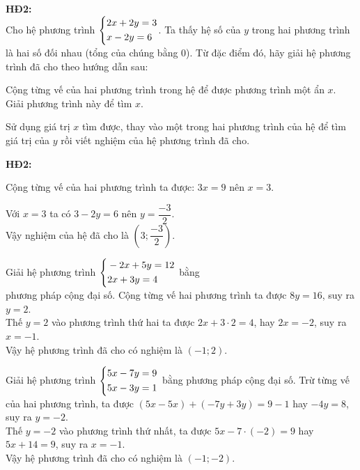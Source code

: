 \noidungsanpham

\begin{ttkp}
    \textbf{HĐ2:}\\
    Cho hệ phương trình $\left\{\begin{aligned}&2x + 2y = 3 \\ &x - 2y = 6\end{aligned}\right.$. Ta thấy hệ số của $y$ trong hai phương trình là hai số đối nhau (tổng của chúng bằng 0). Từ đặc điểm đó, hãy giải hệ phương trình đã cho theo hướng dẫn sau:
    \begin{listEX}
        \item Cộng từng vế của hai phương trình trong hệ để được phương trình một ẩn $x$. Giải phương trình này để tìm $x$.
        \item Sử dụng giá trị $x$ tìm được, thay vào một trong hai phương trình của hệ để tìm giá trị của $y$ rồi viết nghiệm của hệ phương trình đã cho.
    \end{listEX}
    \doicot
    \textbf{HĐ2:}\\
    \huongdan
    \begin{listEX}
        \item Cộng từng vế của hai phương trình ta được: $3x = 9$ nên $x = 3$.
        \item Với $x = 3$ ta có $3 - 2y = 6$ nên $y = \dfrac{-3}{2}$.\\
        Vậy nghiệm của hệ đã cho là $\left(3;\dfrac{-3}{2}\right)$.
    \end{listEX}
\end{ttkp}

\begin{vidu}
    Giải hệ phương trình $\left\{\begin{aligned}&-2x + 5y = 12 \\ &2x + 3y = 4\end{aligned}\right.$ bằng \\
    phương pháp cộng đại số.
    \doicot
    Cộng từng vế hai phương trình ta được $8y = 16$, suy ra $y = 2$.\\
    Thế $y = 2$ vào phương trình thứ hai ta được $2x + 3 \cdot 2 = 4$, hay $2x = -2$, suy ra $x = -1$.\\
    Vậy hệ phương trình đã cho có nghiệm là $(-1; 2)$.
\end{vidu}

\begin{vidu}
    Giải hệ phương trình $\left\{\begin{aligned}&5x - 7y = 9 \\ &5x - 3y = 1\end{aligned}\right.$ bằng phương pháp cộng đại số.
    \doicot
    Trừ từng vế của hai phương trình, ta được $(5x - 5x) + (-7y + 3y) = 9 - 1$ hay $-4y = 8$, suy ra $y = -2$.\\
    Thế $y = -2$ vào phương trình thứ nhất, ta được $5x - 7 \cdot (-2) = 9$ hay $5x + 14 = 9$, suy ra $x = -1$.\\
    Vậy hệ phương trình đã cho có nghiệm là $(-1; -2)$.
\end{vidu}

